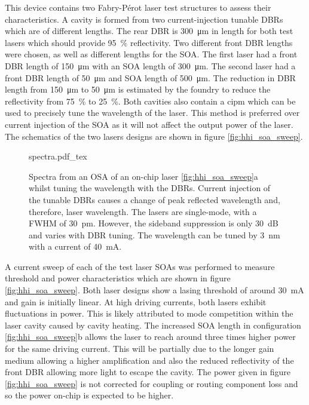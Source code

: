 This device contains two Fabry-P\'{e}rot laser test structures to assess their characteristics. A cavity is formed from two current-injection tunable \acp{DBR} which are of different lengths. The rear \ac{DBR} is \SI{300}{\um} in length for both test lasers which should provide \SI{95}{\percent} reflectivity. Two different front \ac{DBR} lengths were chosen, as well as different lengths for the \ac{SOA}. The first laser had a front \ac{DBR} length of \SI{150}{\um} with an \ac{SOA} length of \SI{300}{\um}. The second laser had a front \ac{DBR} length of \SI{50}{\um} and \ac{SOA} length of \SI{500}{\um}. The reduction in \ac{DBR} length from \SI{150}{\um} to \SI{50}{\um} is estimated by the foundry to reduce the reflectivity from \SI{75}{\percent} to \SI{25}{\percent}. Both cavities also contain a \ac{cipm} which can be used to precisely tune the wavelength of the laser. This method is preferred over current injection of the \ac{SOA} as it will not affect the output power of the laser. The schematics of the two lasers designs are shown in figure \ref{fig:hhi_soa_sweep}.

\begin{figure}[t]
	\centering
	\small	
	\def\svgwidth{0.9\textwidth} 
	{spectra.pdf_tex}
	\caption[Spectra of the HHI laser whilst injecting current to the of DBRs]{Spectra from an \acs{OSA} of an on-chip laser \ref{fig:hhi_soa_sweep}a whilst tuning the wavelength with the \acsp{DBR}. Current injection of the tunable \acsp{DBR} causes a change of peak reflected wavelength and, therefore, laser wavelength. The lasers are single-mode, with a \acs{FWHM} of \SI{30}{pm}. However, the sideband suppression is only \SI{30}{dB} and varies with \acs{DBR} tuning. The wavelength can be tuned by \SI{3}{nm} with a current of \SI{40}{\mA}.}
	\label{fig:hhi_dbr_sweep}
\end{figure}


A current sweep of each of the test laser \acp{SOA} was performed to measure threshold and power characteristics which are shown in figure \ref{fig:hhi_soa_sweep}. Both laser designs show a lasing threshold of around \SI{30}{\mA} and gain is initially linear. At high driving currents, both lasers exhibit fluctuations in power. This is likely attributed to mode competition within the laser cavity caused by cavity heating. The increased \ac{SOA} length in configuration \ref{fig:hhi_soa_sweep}b allows the laser to reach around three times higher power for the same driving current. This will be partially due to the longer gain medium allowing a higher amplification and also the reduced reflectivity of the front \ac{DBR} allowing more light to escape the cavity. The power given in figure \ref{fig:hhi_soa_sweep} is not corrected for coupling or routing component loss and so the power on-chip is expected to be higher. 

